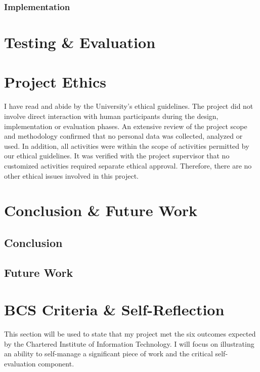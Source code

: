 \documentclass[12pt]{article}
\begin{document}
\subsubsection{Implementation}


\section{Testing \& Evaluation}

\section{Project Ethics}
I have read and abide by the University’s ethical guidelines\cite{UoL_COMP390_2023-24}. The project did not involve direct interaction with human
participants during the design, implementation or evaluation phases. An extensive review of the project scope and methodology
confirmed that no personal data was collected, analyzed or used. In addition, all activities were within the scope of activities
permitted by our ethical guidelines. It was verified with the project supervisor that no customized activities required separate
ethical approval. Therefore, there are no other ethical issues involved in this project.
\section{Conclusion \& Future Work}
\subsection{Conclusion}

\subsection{Future Work}

\section{BCS Criteria \& Self-Reflection}
This section will be used to state that my project met the six outcomes expected by the Chartered Institute of Information Technology\cite{BCS2020}.
I will focus on illustrating an ability to self-manage a significant piece of work and the critical self-evaluation component.
\end{document}
